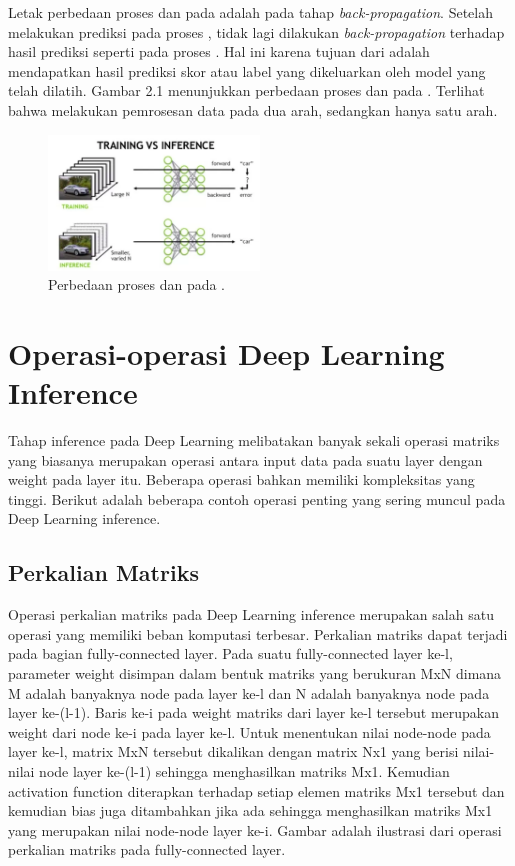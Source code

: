 Letak perbedaan proses \inference dan \training pada \deeplearning adalah pada tahap \textit{back-propagation}. Setelah melakukan prediksi pada proses \inference , tidak lagi dilakukan \textit{back-propagation} terhadap \error hasil prediksi seperti pada proses \training. Hal ini karena tujuan dari \inference adalah mendapatkan hasil prediksi skor atau label yang dikeluarkan oleh model yang telah dilatih. Gambar 2.1 menunjukkan perbedaan proses \training dan \inference pada \nn . Terlihat bahwa \training melakukan pemrosesan data pada dua arah, sedangkan \inference hanya satu arah.

\begin{figure}
	\centering
	\includegraphics[width=0.50\textwidth]
	{pics/trainingvsinference.png}
	\caption{Perbedaan proses \training dan \inference pada \deeplearning.}
	\label{fig:trainvsinfer}
\end{figure}

\section{Operasi-operasi Deep Learning Inference}
Tahap inference pada Deep Learning melibatakan banyak sekali operasi matriks yang biasanya merupakan operasi antara input data pada suatu layer dengan weight pada layer itu. Beberapa operasi bahkan memiliki kompleksitas yang tinggi. Berikut adalah beberapa contoh operasi penting yang sering muncul pada Deep Learning inference.

\subsection{Perkalian Matriks}
Operasi perkalian matriks pada Deep Learning inference merupakan salah satu operasi yang memiliki beban komputasi terbesar. Perkalian matriks dapat terjadi pada bagian fully-connected layer. Pada suatu fully-connected layer ke-l, parameter weight disimpan dalam bentuk matriks yang berukuran MxN dimana M adalah banyaknya node pada layer ke-l dan N adalah banyaknya node pada layer ke-(l-1). Baris ke-i pada weight matriks dari layer ke-l tersebut merupakan weight dari node ke-i pada layer ke-l. Untuk menentukan nilai node-node pada layer ke-l, matrix MxN tersebut dikalikan dengan matrix Nx1 yang berisi nilai-nilai node layer ke-(l-1) sehingga menghasilkan matriks Mx1. Kemudian activation function diterapkan terhadap setiap elemen matriks Mx1 tersebut dan kemudian bias juga ditambahkan jika ada sehingga menghasilkan matriks Mx1 yang merupakan nilai node-node layer ke-i. Gambar adalah ilustrasi dari operasi perkalian matriks pada fully-connected layer.

